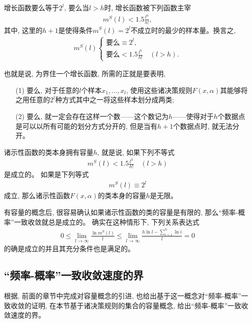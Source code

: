 \begin{theorem}\label{theorem6.6}
\citep{vapnik1998}
增长函数要么等于$2^{l}$, 要么当$l>h$时, 增长函数被下列函数主宰
\begin{align}
m^{S}(l)<1.5 \frac{l^{h}}{h !},
\end{align}
其中, 这里的$h+1$是使得条件$m^{S}(l)=2^{l}$不成立时的最少的样本量。换言之,
\begin{align}
m^{S}(l)\left\{\begin{array}{l}
\text{要么} \equiv 2^{l} ,\\
\text{要么} <1.5 \frac{l^{h}}{h !} \quad(l>h).
\end{array}\right.
\end{align}
\end{theorem}

也就是说, 为界住一个增长函数, 所需的正就是要表明,
\begin{enumerate}
\item[(1)] 要么, 对于任意的$l$个样本$x_1,\ldots,x_l$, 使用这些诸决策规则$F(x, \alpha)$其能够将之用任意的$2^l$种方式其中之一将这些样本划分成两类;
\item[(2)] 要么, 就一定会存在这样一个数——这个数记为$h$——使得对于$h$个数据点是可以以所有可能的划分方式分开的, 但是当有$h+1$个数据点时, 就无法分开。
\end{enumerate}

\begin{definition}\citep{vapnik1998}
诸示性函数的类本身拥有容量$h$, 就是说, 如果下列不等式
\begin{align}\label{ch6.39}
m^{S}(l)<1.5 \frac{l^{h}}{h !} \quad(l>h)
\end{align}
是成立的。 如果是下列等式
\begin{align}
m^{S}(l) \equiv 2^{l}
\end{align}
成立, 那么诸示性函数$F(x,\alpha)$的类本身的容量$h$是无限。
\end{definition}

有容量的概念后, 很容易确认如果诸示性函数的类的容量是有限的, 那么“频率-概率”一致收敛就总是成立的。 确实在这种情形下, 下列关系表达式
\begin{align}
0 \leq \lim _{l \rightarrow \infty} \frac{\ln m^{S}(l)}{l} \leq \lim _{l \rightarrow \infty} \frac{h \ln l-\sum_{i=1}^{h} \ln i}{l}=0
\end{align}
的确是成立的并且其充分条件也是满足的\citep{vapnik1998}。

\subsection{“频率-概率”一致收敛速度的界}
\label{sec:rate-of-convergence}
根据\citet{Vapnik2006}, 前面的章节中完成对容量概念的引进, 也给出基于这一概念对“频率-概率”一致收敛的证明, 在本节基于诸决策规则的集合的容量概念, 给出“频率-概率”一致收敛速度的界。 

